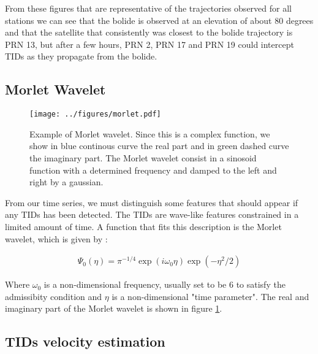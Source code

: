 From these figures that are representative of the trajectories observed for all stations we can see that the bolide is observed at an elevation of about 80 degrees and that the satellite that consistently was closest to the bolide trajectory is PRN 13, but after a few hours, PRN 2, PRN 17 and PRN 19 could intercept TIDs as they propagate from the bolide. 

\subsection{Morlet Wavelet}
\label{ssec:Morlet}
\begin{figure}
    \centering
    \texttt{[image: ../figures/morlet.pdf]}
    \caption{Example of Morlet wavelet. Since this is a complex function, we show in blue continous curve the real part and in green dashed curve the imaginary part. The Morlet wavelet consist in a sinosoid function with a determined frequency and damped to the left and right by a gaussian.}
    \label{fig:Morlet_wavelet}
\end{figure}

From our time series, we must distinguish some features that should appear if any TIDs has been detected. The TIDs are wave-like features constrained in a limited amount of time. A function that fits this description is the Morlet wavelet, which is given by \citep{Torrence:1998}:

\begin{align}
    \Psi_0(\eta) = \pi^{-1/4}\exp(i\omega_0\eta)\exp(-\eta^2/2)
\end{align}

Where $\omega_0$ is a non-dimensional frequency, usually set to be 6 to satisfy the admissibity condition \citep{Farge:1992} and $\eta$ is a non-dimensional "time parameter". The real and imaginary part of the Morlet wavelet is shown in figure \ref{fig:Morlet_wavelet}.

\subsection{TIDs velocity estimation}


